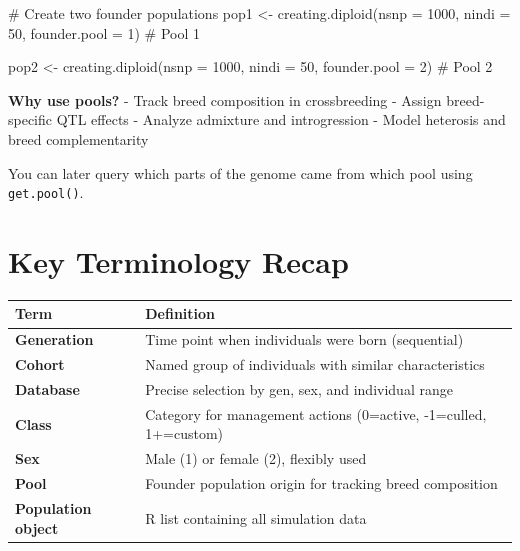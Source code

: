 \documentclass[
  letterpaper,
]{book}
\newenvironment{Shaded}{\begin{snugshade}}{\end{snugshade}}
\newcommand{\AttributeTok}[1]{\textcolor[rgb]{0.40,0.45,0.13}{#1}}
\newcommand{\CommentTok}[1]{\textcolor[rgb]{0.37,0.37,0.37}{#1}}
\newcommand{\DecValTok}[1]{\textcolor[rgb]{0.68,0.00,0.00}{#1}}
\newcommand{\FunctionTok}[1]{\textcolor[rgb]{0.28,0.35,0.67}{#1}}
\newcommand{\NormalTok}[1]{\textcolor[rgb]{0.00,0.23,0.31}{#1}}
\newcommand{\OtherTok}[1]{\textcolor[rgb]{0.00,0.23,0.31}{#1}}
\begin{document}
\begin{Shaded}
\begin{Highlighting}[]
\CommentTok{\# Create two founder populations}
\NormalTok{pop1 }\OtherTok{\textless{}{-}} \FunctionTok{creating.diploid}\NormalTok{(}\AttributeTok{nsnp =} \DecValTok{1000}\NormalTok{, }\AttributeTok{nindi =} \DecValTok{50}\NormalTok{,}
                         \AttributeTok{founder.pool =} \DecValTok{1}\NormalTok{)  }\CommentTok{\# Pool 1}

\NormalTok{pop2 }\OtherTok{\textless{}{-}} \FunctionTok{creating.diploid}\NormalTok{(}\AttributeTok{nsnp =} \DecValTok{1000}\NormalTok{, }\AttributeTok{nindi =} \DecValTok{50}\NormalTok{,}
                         \AttributeTok{founder.pool =} \DecValTok{2}\NormalTok{)  }\CommentTok{\# Pool 2}
\end{Highlighting}
\end{Shaded}

\textbf{Why use pools?} - Track breed composition in crossbreeding -
Assign breed-specific QTL effects - Analyze admixture and introgression
- Model heterosis and breed complementarity

You can later query which parts of the genome came from which pool using
\texttt{get.pool()}.

\section{Key Terminology Recap}\label{key-terminology-recap}

\begin{longtable}[]{@{}
  >{\raggedright\arraybackslash}p{}
  >{\raggedright\arraybackslash}p{}@{}}
\toprule\noalign{}
\begin{minipage}[b]{\linewidth}\raggedright
Term
\end{minipage} & \begin{minipage}[b]{\linewidth}\raggedright
Definition
\end{minipage} \\
\midrule\noalign{}
\endhead
\bottomrule\noalign{}
\endlastfoot
\textbf{Generation} & Time point when individuals were born
(sequential) \\
\textbf{Cohort} & Named group of individuals with similar
characteristics \\
\textbf{Database} & Precise selection by gen, sex, and individual
range \\
\textbf{Class} & Category for management actions (0=active, -1=culled,
1+=custom) \\
\textbf{Sex} & Male (1) or female (2), flexibly used \\
\textbf{Pool} & Founder population origin for tracking breed
composition \\
\textbf{Population object} & R list containing all simulation data \\
\end{longtable}
\end{document}

